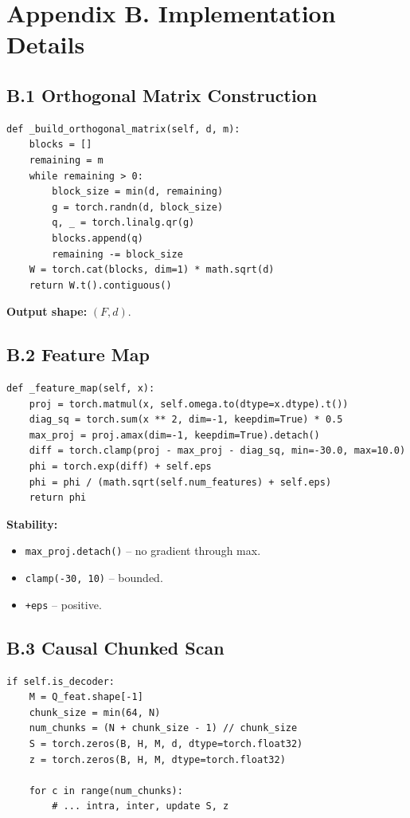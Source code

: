 
\section{Appendix B. Implementation Details}

\subsection{B.1 Orthogonal Matrix Construction}

\begin{lstlisting}
def _build_orthogonal_matrix(self, d, m):
    blocks = []
    remaining = m
    while remaining > 0:
        block_size = min(d, remaining)
        g = torch.randn(d, block_size)
        q, _ = torch.linalg.qr(g)
        blocks.append(q)
        remaining -= block_size
    W = torch.cat(blocks, dim=1) * math.sqrt(d)
    return W.t().contiguous()
\end{lstlisting}

\textbf{Output shape:} $(F, d)$.

\subsection{B.2 Feature Map}

\begin{lstlisting}
def _feature_map(self, x):
    proj = torch.matmul(x, self.omega.to(dtype=x.dtype).t())
    diag_sq = torch.sum(x ** 2, dim=-1, keepdim=True) * 0.5
    max_proj = proj.amax(dim=-1, keepdim=True).detach()
    diff = torch.clamp(proj - max_proj - diag_sq, min=-30.0, max=10.0)
    phi = torch.exp(diff) + self.eps
    phi = phi / (math.sqrt(self.num_features) + self.eps)
    return phi
\end{lstlisting}

\textbf{Stability:}
\begin{itemize}
\item \texttt{max\_proj.detach()} -- no gradient through max.
\item \texttt{clamp(-30, 10)} -- bounded.
\item \texttt{+eps} -- positive.

\end{itemize}
\subsection{B.3 Causal Chunked Scan}

\begin{lstlisting}
if self.is_decoder:
    M = Q_feat.shape[-1]
    chunk_size = min(64, N)
    num_chunks = (N + chunk_size - 1) // chunk_size
    S = torch.zeros(B, H, M, d, dtype=torch.float32)
    z = torch.zeros(B, H, M, dtype=torch.float32)
    
    for c in range(num_chunks):
        # ... intra, inter, update S, z
\end{lstlisting}

